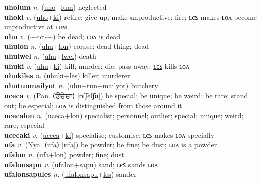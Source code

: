 \textbf{uholum} \textit{n.} (\hyperref[uho]{uho}+\hyperref[lum]{lum})
neglected \label{uholum} \\
\textbf{uhoki} \textit{v.} (\hyperref[uho]{uho}+\hyperref[ki]{ki})
retire; give up; make unproductive; fire; ʟєꜱ makes ʟᴏᴧ become unproductive at ʟᴜᴍ \label{uhoki} \\
\textbf{uhu} \textit{v.} (\hyperref[ici]{\~{}\~{}ici\~{}\~{}})
be dead; \hyperref[uhulon]{ʟᴏᴧ} is dead \label{uhu} \\
\textbf{uhulon} \textit{n.} (\hyperref[uhu]{uhu}+\hyperref[lon]{lon})
corpse; dead thing; dead \label{uhulon} \\
\textbf{uhulwel} \textit{n.} (\hyperref[uhu]{uhu}+\hyperref[lwel]{lwel})
death \label{uhulwel} \\
\textbf{uhuki} \textit{v.} (\hyperref[uhu]{uhu}+\hyperref[ki]{ki})
kill; murder; die; pass away; \hyperref[uhukiles]{ʟєꜱ} kills ʟᴏᴧ \label{uhuki} \\
\textbf{uhukiles} \textit{n.} (\hyperref[uhuki]{uhuki}+\hyperref[les]{les})
killer; murderer \label{uhukiles} \\
\textbf{uhutunmailyot} \textit{n.} (\hyperref[uhu]{uhu}+\hyperref[tun]{tun}+\hyperref[mailyot]{mailyot})
butchery \label{uhutunmailyot} \\
\textbf{uceca} \textit{v.} (Pan. ⟨ਉਚੇਚਾ⟩ [ʊt͡ʃet͡ʃɑ])
be special; be unique; be weird; be rare; stand out; be especial; \hyperref[ucecalon]{ʟᴏᴧ} is distinguished from those around it \label{uceca} \\
\textbf{ucecalon} \textit{n.} (\hyperref[uceca]{uceca}+\hyperref[lon]{lon})
specialist; personnel; outlier; special; unique; weird; rare; especial \label{ucecalon} \\
\textbf{ucecaki} \textit{v.} (\hyperref[uceca]{uceca}+\hyperref[ki]{ki})
specialise; customise; ʟєꜱ makes ʟᴏᴧ specially \label{ucecaki} \\
\textbf{ufa} \textit{v.} (Nya. ⟨ufa⟩ [ufa])
be powder; be fine; be dust; \hyperref[ufalon]{ʟᴏᴧ} is a powder \label{ufa} \\
\textbf{ufalon} \textit{n.} (\hyperref[ufa]{ufa}+\hyperref[lon]{lon})
powder; fine; dust \label{ufalon} \\
\textbf{ufalonsapu} \textit{v.} (\hyperref[ufalon]{ufalon}+\hyperref[sapu]{sapu})
sand; \hyperref[ufalonsapules]{ʟєꜱ} sands \hyperref[ufalonsapulon]{ʟᴏᴧ} \label{ufalonsapu} \\
\textbf{ufalonsapules} \textit{n.} (\hyperref[ufalonsapu]{ufalonsapu}+\hyperref[les]{les})
sander \label{ufalonsapules} \\
